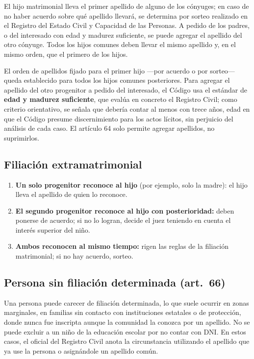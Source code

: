 \documentclass[12pt,oneside]{book}
\begin{document}
\begin{regla}
El hijo matrimonial lleva el primer apellido de alguno de los cónyuges; en caso de no haber acuerdo sobre qué apellido llevará, se determina por sorteo realizado en el Registro del Estado Civil y Capacidad de las Personas. A pedido de los padres, o del interesado con edad y madurez suficiente, se puede agregar el apellido del otro cónyuge. Todos los hijos comunes deben llevar el mismo apellido y, en el mismo orden, que el primero de los hijos.
\end{regla}

El orden de apellidos fijado para el primer hijo ---por acuerdo o por sorteo--- queda establecido para todos los hijos comunes posteriores. Para agregar el apellido del otro progenitor a pedido del interesado, el Código usa el estándar de \textbf{edad y madurez suficiente}, que evalúa en concreto el Registro Civil; como criterio orientativo, se señala que debería contar al menos con trece años, edad en que el Código presume discernimiento para los actos lícitos, sin perjuicio del análisis de cada caso. El artículo 64 solo permite agregar apellidos, no suprimirlos.

\subsection{Filiación extramatrimonial}

\begin{enumerate}
\item \textbf{Un solo progenitor reconoce al hijo} (por ejemplo, solo la madre): el hijo lleva el apellido de quien lo reconoce.
\item \textbf{El segundo progenitor reconoce al hijo con posterioridad:} deben ponerse de acuerdo; si no lo logran, decide el juez teniendo en cuenta el interés superior del niño.
\item \textbf{Ambos reconocen al mismo tiempo:} rigen las reglas de la filiación matrimonial; si no hay acuerdo, sorteo.
\end{enumerate}

\subsection{Persona sin filiación determinada (art.~66)}

Una persona puede carecer de filiación determinada, lo que suele ocurrir en zonas marginales, en familias sin contacto con instituciones estatales o de protección, donde nunca fue inscripta aunque la comunidad la conozca por un apellido. No se puede excluir a un niño de la educación escolar por no contar con DNI. En estos casos, el oficial del Registro Civil anota la circunstancia utilizando el apellido que ya use la persona o asignándole un apellido común.
\end{document}

